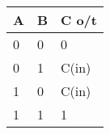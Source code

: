 
\begin{tabular}{|l|l|l|} \hline
A & B & C o/t  \\ \hline
0 & 0 & 0      \\
0 & 1 & C(in)  \\
1 & 0 & C(in)  \\
1 & 1 & 1      \\ \hline
\end{tabular}


